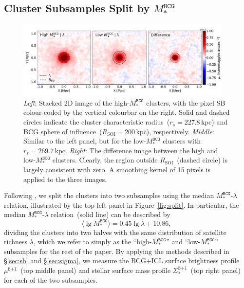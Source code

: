 \documentclass[fleqn,usenatbib]{mnras}
\newcommand{\rsoi}{R_{\mathrm{SOI}}}
\newcommand{\sigbi}{\Sigma_*^{\texttt{B+I}}}
\newcommand{\mubi}{\mu^{\texttt{B+I}}}
\newcommand{\msbcg}{M_*^{\texttt{BCG}}}
\newcommand{\kpc}{\mathrm{kpc}}
\begin{document}
\subsection{Cluster Subsamples Split by \texorpdfstring{$\msbcg$}{Mstar}}
\label{subsec:split}

\begin{figure}
    \centering\includegraphics[width=0.96\textwidth]{fig/BCG_M_bin_r_band_diffi_img.pdf}
    \caption{{\it Left}: Stacked 2D image of the high-$\msbcg$ clusters,
    with the pixel SB colour-coded by the vertical colourbar on the right.
    Solid and dashed circles indicate the cluster characteristic
    radius~($r_{s}{=}227.8\,\kpc$) and BCG sphere of
    influence~($\rsoi{=}200\,\kpc$), respectively.  {\it Middle}: Similar
    to the left panel, but for the low-$\msbcg$ clusters with
    $r_{s}{=}269.7\,\kpc$. {\it Right}: The difference image between the
    high and low-$\msbcg$ clusters. Clearly, the region outside
    $\rsoi$~(dashed circle) is largely consistent with zero. A smoothing
    kernel of 15 pixels is applied to the three images.  \label{fig:image2Dsub}}
\end{figure}

Following , we split the clusters into two subsamples
using the median $\msbcg$-$\lambda$ relation, illustrated by the top left
panel in Figure~\ref{fig:split}. In particular, the median
$\msbcg$-$\lambda$ relation~(solid line) can be described by
\begin{equation}
\langle \lg\msbcg \rangle = 0.45 \lg \lambda + 10.86,
\end{equation}
dividing the clusters into two halves with the same distribution of
satellite richness $\lambda$, which we refer to simply as the
``high-$\msbcg$'' and ``low-$\msbcg$'' subsamples for the rest of the
paper. By applying the methods described in \S\ref{sec:sb} and
\S\ref{sec:sigma}, we measure the BCG+ICL surface brightness profile
$\mubi$~(top middle panel) and stellar surface mass profile $\sigbi$~(top
right panel) for each of the two subsamples.
\end{document}
